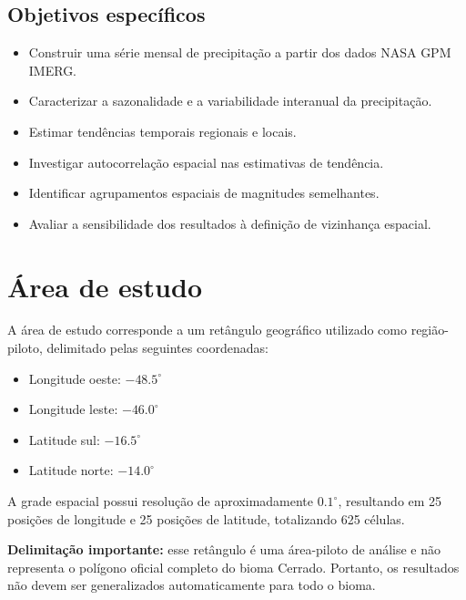 \documentclass[12pt,a4paper]{article}
\begin{document}
\subsection{Objetivos específicos}

\begin{itemize}
    \item Construir uma série mensal de precipitação
    a partir dos dados NASA GPM IMERG.
    \item Caracterizar a sazonalidade e a variabilidade
    interanual da precipitação.
    \item Estimar tendências temporais regionais e locais.
    \item Investigar autocorrelação espacial nas
    estimativas de tendência.
    \item Identificar agrupamentos espaciais de
    magnitudes semelhantes.
    \item Avaliar a sensibilidade dos resultados à
    definição de vizinhança espacial.
\end{itemize}

\section{Área de estudo}

A área de estudo corresponde a um retângulo geográfico
utilizado como região-piloto, delimitado pelas seguintes
coordenadas:

\begin{itemize}
    \item Longitude oeste: $-48.5^\circ$
    \item Longitude leste: $-46.0^\circ$
    \item Latitude sul: $-16.5^\circ$
    \item Latitude norte: $-14.0^\circ$
\end{itemize}

A grade espacial possui resolução de aproximadamente
$0.1^\circ$, resultando em 25 posições de longitude e
25 posições de latitude, totalizando 625 células.

\textbf{Delimitação importante:} esse retângulo é uma
área-piloto de análise e não representa o polígono
oficial completo do bioma Cerrado. Portanto, os
resultados não devem ser generalizados automaticamente
para todo o bioma.

\end{document}
